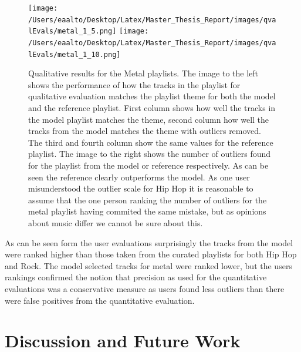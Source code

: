 \documentclass[a4paper,11pt]{kth-mag}
\begin{document}
\begin{figure}
\centering
\texttt{[image: /Users/eaalto/Desktop/Latex/Master\_Thesis\_Report/images/qvalEvals/metal\_1\_5.png]}
\texttt{[image: /Users/eaalto/Desktop/Latex/Master\_Thesis\_Report/images/qvalEvals/metal\_1\_10.png]}

\caption{Qualitative results for the Metal playlists. The image to the left shows the performance of how the tracks in the playlist for qualitative evaluation matches the playlist theme for both the model and the reference playlist. First column shows how well the tracks in the model playlist matches the theme, second column how well the tracks from the model matches the theme with outliers removed. The third and fourth column show the same values for the reference playlist. The image to the right shows the number of outliers found for the playlist from the model or reference respectively. As can be seen the reference clearly outperforms the model. As one user misunderstood the outlier scale for Hip Hop it is reasonable to assume that the one person ranking the number of outliers for the metal playlist having commited the same mistake, but as opinions about music differ we cannot be sure about this.}
\end{figure}

As can be seen form the user evaluations surprisingly the tracks from the model were ranked higher than those taken from the curated playlists for both Hip Hop and Rock. The model selected tracks for metal were ranked lower, but the users rankings confirmed the notion that precision as used for the quantitative evaluations was a conservative measure as users found less outliers than there were false positives from the quantitative evaluation.

\chapter{Discussion and Future Work}
\end{document}
